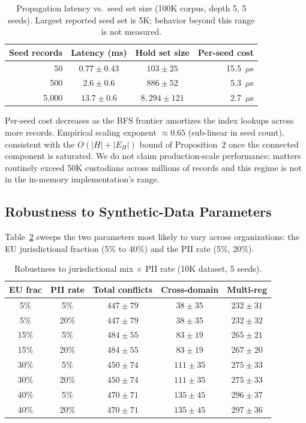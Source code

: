 \documentclass{ieeeaccess}
\begin{document}
\begin{table}[t]
\centering
\caption{Propagation latency vs.\ seed set size (100K corpus, depth 5, 5 seeds). Largest reported seed set is 5K; behavior beyond this range is not measured.}
\label{tab:largeseed}
\begin{tabular}{rccr}
\hline\hline
Seed records & Latency (ms) & Hold set size & Per-seed cost \\
\hline
50    & $0.77 \pm 0.43$ & $103 \pm 25$    & 15.5~$\mu$s \\
500   & $2.6 \pm 0.6$   & $886 \pm 52$    & 5.3~$\mu$s \\
5{,}000 & $13.7 \pm 0.6$  & $8{,}294 \pm 121$ & 2.7~$\mu$s \\
\hline\hline
\end{tabular}
\end{table}

Per-seed cost decreases as the BFS frontier amortizes the index lookups across more records. Empirical scaling exponent $\approx 0.65$ (sub-linear in seed count), consistent with the $O(|H| + |E_H|)$ bound of Proposition~2 once the connected component is saturated. We do not claim production-scale performance; matters routinely exceed 50K custodians across millions of records and this regime is not in the in-memory implementation's range.

\subsection{Robustness to Synthetic-Data Parameters}
\label{sec:robustness}

Table~\ref{tab:robustness} sweeps the two parameters most likely to vary across organizations: the EU jurisdictional fraction (5\% to 40\%) and the PII rate (5\%, 20\%).

\begin{table}[t]
\centering
\caption{Robustness to jurisdictional mix $\times$ PII rate (10K dataset, 5 seeds).}
\label{tab:robustness}
\begin{tabular}{ccccc}
\hline\hline
EU frac & PII rate & Total conflicts & Cross-domain & Multi-reg \\
\hline
5\%  & 5\%  & $447 \pm 79$ & $38 \pm 35$  & $232 \pm 31$ \\
5\%  & 20\% & $447 \pm 79$ & $38 \pm 35$  & $232 \pm 32$ \\
15\% & 5\%  & $484 \pm 55$ & $83 \pm 19$  & $265 \pm 21$ \\
15\% & 20\% & $484 \pm 55$ & $83 \pm 19$  & $267 \pm 20$ \\
30\% & 5\%  & $450 \pm 74$ & $111 \pm 35$ & $275 \pm 33$ \\
30\% & 20\% & $450 \pm 74$ & $111 \pm 35$ & $275 \pm 33$ \\
40\% & 5\%  & $470 \pm 71$ & $135 \pm 45$ & $296 \pm 37$ \\
40\% & 20\% & $470 \pm 71$ & $135 \pm 45$ & $297 \pm 36$ \\
\hline\hline
\end{tabular}
\end{table}
\end{document}
